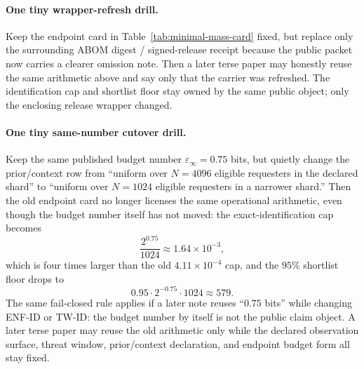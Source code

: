 \documentclass[11pt]{article}
\theoremstyle{definition}
\theoremstyle{remark}
\begin{document}
\paragraph{One tiny wrapper-refresh drill.}
Keep the endpoint card in Table~\ref{tab:minimal-mass-card} fixed, but replace only the surrounding ABOM digest / signed-release receipt because the public packet now carries a clearer omission note. Then a later terse paper may honestly reuse the same arithmetic above and say only that the carrier was refreshed. The identification cap and shortlist floor stay owned by the same public object; only the enclosing release wrapper changed.

\paragraph{One tiny same-number cutover drill.}
Keep the same published budget number $\varepsilon_\infty=0.75$ bits, but quietly change the prior/context row from ``uniform over $N=4096$ eligible requesters in the declared shard'' to ``uniform over $N=1024$ eligible requesters in a narrower shard.'' Then the old endpoint card no longer licenses the same operational arithmetic, even though the budget number itself has not moved: the exact-identification cap becomes
\[
\frac{2^{0.75}}{1024} \approx 1.64\times 10^{-3},
\]
which is four times larger than the old $4.11\times 10^{-4}$ cap, and the $95\%$ shortlist floor drops to
\[
0.95\cdot 2^{-0.75}\cdot 1024 \approx 579.
\]
The same fail-closed rule applies if a later note reuses ``$0.75$ bits'' while changing ENF-ID or TW-ID: the budget number by itself is not the public claim object. A later terse paper may reuse the old arithmetic only while the declared observation surface, threat window, prior/context declaration, and endpoint budget form all stay fixed.
\end{document}
